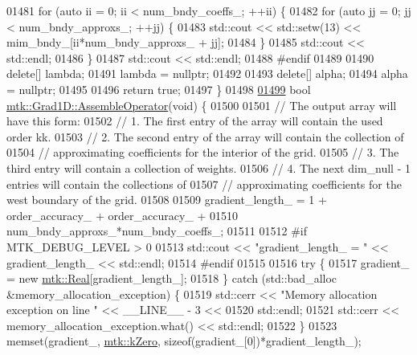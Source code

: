 \begin{DoxyCode}
{{01481   \textcolor{keywordflow}{for} (\textcolor{keyword}{auto} ii = 0; ii < num\_bndy\_coeffs\_; ++ii) \{
01482     \textcolor{keywordflow}{for} (\textcolor{keyword}{auto} jj = 0; jj < num\_bndy\_approxs\_; ++jj) \{
01483       std::cout << std::setw(13) << mim\_bndy\_[ii*num\_bndy\_approxs\_ + jj];
01484     \}
01485     std::cout << std::endl;
01486   \}
01487   std::cout << std::endl;
01488 \textcolor{preprocessor}{  #endif}
01489 
01490   \textcolor{keyword}{delete}[] lambda;
01491   lambda = \textcolor{keyword}{nullptr};
01492 
01493   \textcolor{keyword}{delete}[] alpha;
01494   alpha = \textcolor{keyword}{nullptr};
01495 
01496   \textcolor{keywordflow}{return} \textcolor{keyword}{true};
01497 \}
01498 
\hypertarget{mtk__grad__1d_8cc_source_l01499}{}\hyperlink{classmtk_1_1Grad1D_a4eb4d363506b8c64b2bb18a318bbd259}{01499} \textcolor{keywordtype}{bool} \hyperlink{classmtk_1_1Grad1D_a4eb4d363506b8c64b2bb18a318bbd259}{mtk::Grad1D::AssembleOperator}(\textcolor{keywordtype}{void}) \{
01500 
01501   \textcolor{comment}{// The output array will have this form:}
01502   \textcolor{comment}{// 1. The first entry of the array will contain the used order kk.}
01503   \textcolor{comment}{// 2. The second entry of the array will contain the collection of}
01504   \textcolor{comment}{// approximating coefficients for the interior of the grid.}
01505   \textcolor{comment}{// 3. The third entry will contain a collection of weights.}
01506   \textcolor{comment}{// 4. The next dim\_null - 1 entries will contain the collections of}
01507   \textcolor{comment}{// approximating coefficients for the west boundary of the grid.}
01508 
01509   gradient\_length\_ = 1 + order\_accuracy\_ + order\_accuracy\_ +
01510     num\_bndy\_approxs\_*num\_bndy\_coeffs\_;
01511 
01512 \textcolor{preprocessor}{  #if MTK\_DEBUG\_LEVEL > 0}
01513   std::cout << \textcolor{stringliteral}{"gradient\_length\_ = "} << gradient\_length\_ << std::endl;
01514 \textcolor{preprocessor}{  #endif}
01515 
01516   \textcolor{keywordflow}{try} \{
01517     gradient\_ = \textcolor{keyword}{new} \hyperlink{group__c01-roots_gac080bbbf5cbb5502c9f00405f894857d}{mtk::Real}[gradient\_length\_];
01518   \} \textcolor{keywordflow}{catch} (std::bad\_alloc &memory\_allocation\_exception) \{
01519     std::cerr << \textcolor{stringliteral}{"Memory allocation exception on line "} << \_\_LINE\_\_ - 3 <<
01520       std::endl;
01521     std::cerr << memory\_allocation\_exception.what() << std::endl;
01522   \}
01523   memset(gradient\_, \hyperlink{group__c01-roots_ga59a451a5fae30d59649bcda274fea271}{mtk::kZero}, \textcolor{keyword}{sizeof}(gradient\_[0])*gradient\_length\_);
}}
\end{DoxyCode}

